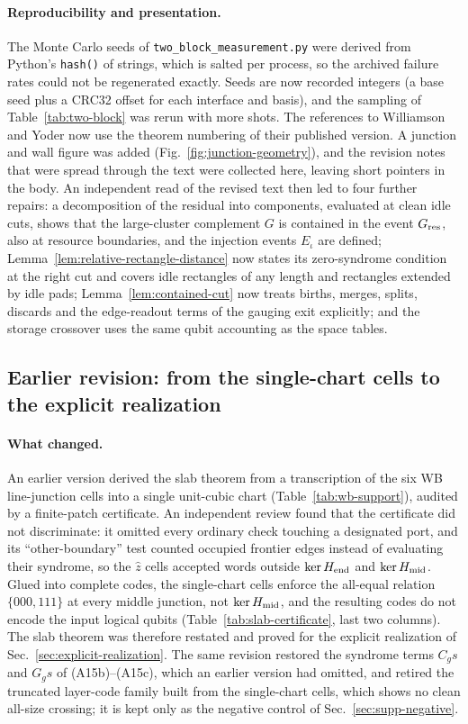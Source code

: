 \documentclass[aps,prx,reprint,superscriptaddress,nofootinbib,floatfix,longbibliography]{revtex4-2}
\theoremstyle{definition}
\begin{document}
\paragraph{Reproducibility and presentation.}
The Monte Carlo seeds of \texttt{two\_block\_measurement.py} were derived from
Python's \texttt{hash()} of strings, which is salted per process, so the
archived failure rates could not be regenerated exactly.  Seeds are now
recorded integers (a base seed plus a CRC32 offset for each interface and
basis), and the sampling of Table~\ref{tab:two-block} was rerun with more
shots.  The references to Williamson and Yoder now use the theorem numbering
of their published version.  A junction and wall figure was added
(Fig.~\ref{fig:junction-geometry}), and the revision notes that were spread
through the text were collected here, leaving short pointers in the body.  An
independent read of the revised text then led to four further repairs:
a decomposition of the residual into components, evaluated at clean idle
cuts, shows that the large-cluster complement $G$ is contained in the event
$G_{\rm res}$, also at resource boundaries, and the injection events
$E_\iota$ are defined; Lemma~\ref{lem:relative-rectangle-distance} now states
its zero-syndrome condition at the right cut and covers idle rectangles of
any length and rectangles extended by idle pads; Lemma~\ref{lem:contained-cut} now
treats births, merges, splits, discards and the edge-readout terms of the
gauging exit explicitly; and the storage crossover uses the same qubit
accounting as the space tables.

\subsection{Earlier revision: from the single-chart cells to the explicit realization}
\paragraph{What changed.}
An earlier version derived the slab theorem from a transcription of the six
WB line-junction cells into a single unit-cubic chart
(Table~\ref{tab:wb-support}), audited by a finite-patch certificate.  An
independent review found that the certificate did not discriminate: it
omitted every ordinary check touching a designated port, and its
``other-boundary'' test counted occupied frontier edges instead of evaluating
their syndrome, so the $\hat z$ cells accepted words outside
$\ker H_{\rm end}$ and $\ker H_{\rm mid}$.  Glued into complete codes, the
single-chart cells enforce the all-equal relation $\{000,111\}$ at every
middle junction, not $\ker H_{\rm mid}$, and the resulting codes do not encode
the input logical qubits (Table~\ref{tab:slab-certificate}, last two columns).
The slab theorem was therefore restated and proved for the explicit
realization of Sec.~\ref{sec:explicit-realization}.  The same revision
restored the syndrome terms $C_gs$ and $G_gs$ of (A15b)--(A15c), which an
earlier version had omitted, and retired the truncated layer-code family built
from the single-chart cells, which shows no clean all-size crossing; it is
kept only as the negative control of Sec.~\ref{sec:supp-negative}.
\end{document}
